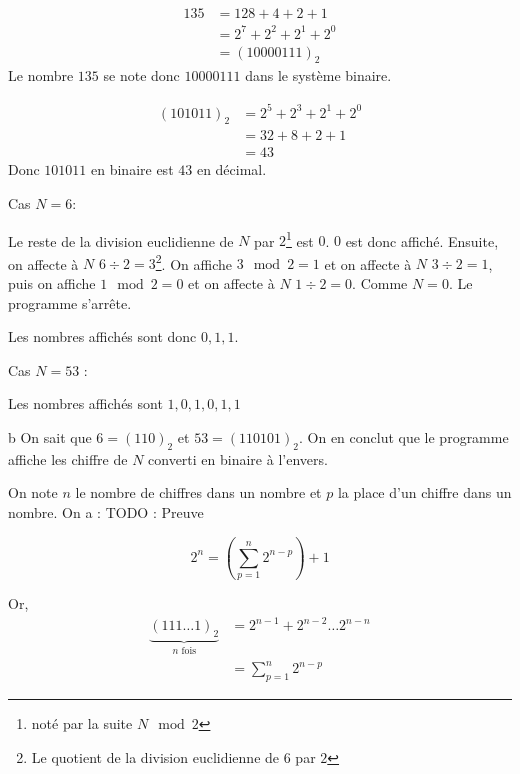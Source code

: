 

\begin{equation*}
	\begin{split}
		135 & = 128 + 4 + 2 + 1 \\
		    & = 2^7 + 2^2 + 2^1 + 2^0 \\
		    & = (10000111)_2
	\end{split}
\end{equation*}
Le nombre $135$ se note donc $10000111$ dans le système binaire.

\begin{equation*}
	\begin{split}
		(101011)_2 & = 2^5 + 2^3 + 2^1 + 2^0 \\
				   & = 32 + 8 + 2 + 1 \\
				   & = 43
	\end{split}
\end{equation*}
Donc $101011$ en binaire est $43$ en décimal.

Cas $N=6$:\par
Le reste de la division euclidienne de $N$ par $2$\footnote{noté par la suite $N\mod 2$} est $0$. $0$ est donc affiché.
Ensuite, on affecte à $N$ $6 \div 2 = 3$\footnote{Le quotient de la division euclidienne de $6$ par $2$}. On affiche $3 \mod 2 = 1$ et on affecte à $N$ $3\div 2 = 1$, puis on affiche $1 \mod 2 = 0$ et on affecte à $N$ $1 \div 2 = 0$. Comme $N = 0$. Le programme s'arrête.

Les nombres affichés sont donc $0, 1, 1$. \newline

Cas $N=53$ :\par

Les nombres affichés sont $1,0,1,0,1,1$

\subsubExo b
On sait que $6 = (110)_2$ et $53=(110101)_2$. On en conclut que le programme affiche les chiffre de $N$ converti en binaire à l'envers.

On note $n$ le nombre de chiffres dans un nombre et $p$ la place d'un chiffre dans un nombre. On a : TODO : Preuve

\[2^n = (\sum_{p=1}^n 2^{n-p})+1\]

Or,
\begin{equation*}
	\begin{split}
		\underbrace{(111\dots1)_2}_{\text{$n$ fois}} & = 2^{n-1} + 2^{n-2}\dots2^{n-n} \\
				& = \sum_{p=1}^n 2^{n-p}
	\end{split}
\end{equation*}

